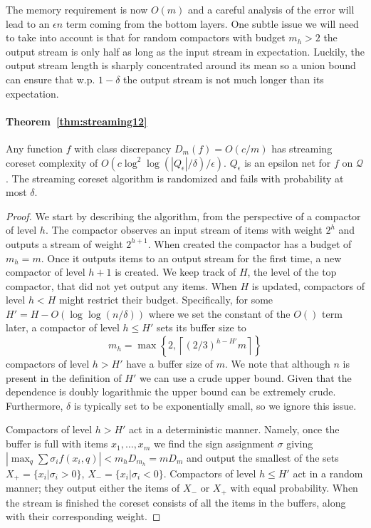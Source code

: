 \documentclass[anon,12pt]{colt2019} %
\newcommand{\eps}{\epsilon}
\newcommand{\F}{\mathcal{F}}
\newcommand{\Q}{\mathcal{Q}}
\newcommand{\ceil}[1]{\left \lceil #1 \right \rceil}
\begin{document}
{The memory requirement is now $O(m)$ and a careful analysis of the error will lead to an $\eps n$ term coming from the bottom layers. One subtle issue we will need to take into account is that for random compactors with budget $m_h>2$ the output stream is only half as long as the input stream in expectation. Luckily, the output stream length is sharply concentrated around its mean so a union bound can ensure that w.p. $1-\delta$ the output stream is not much longer than its expectation.



\paragraph{Theorem~\ref{thm:streaming12}} 
Any function $f$ with class discrepancy $D_m(f) = O(c/m)$ has streaming coreset complexity of $O\left(c\log^2\log(|Q_\eps|/\delta)/\eps\right)$.
$Q_\eps$ is an epsilon net for $f$ on $\Q$. 
The streaming coreset algorithm is randomized and fails with probability at most $\delta$.
\begin{proof}
We start by describing the algorithm, from the perspective of a compactor of level $h$. The compactor observes an input stream of items with weight $2^h$ and outputs a stream of weight $2^{h+1}$. When created the compactor has a budget of $m_h=m$. Once it outputs items to an output stream for the first time, a new compactor of level $h+1$ is created. We keep track of $H$, the level of the top compactor, that did not yet output any items. When $H$ is updated, compactors of level $h<H$ might restrict their budget. Specifically, for some $H'=H-O(\log\log(n/\delta))$ where we set the constant of the $O()$ term later, a compactor of level $h \leq H'$ sets its buffer size to
$$ m_h = \max\left\{2, \ceil{(2/3)^{h-H'}m} \right\} $$
compactors of level $h >H'$ have a buffer size of $m$. We note that although $n$ is present in the definition of $H'$ we can use a crude upper bound. Given that the dependence is doubly logarithmic the upper bound can be extremely crude. Furthermore, $\delta$ is typically set to be exponentially small, so we ignore this issue.

Compactors of level $h >H'$ act in a deterministic manner. Namely, once the buffer is full with items $x_1,\ldots,x_m$ we find the sign assignment $\sigma$ giving $\left|\max_q \sum \sigma_i f(x_i, q)\right| < m_hD_{m_h}=mD_m$ and output the smallest of the sets $X_+=\{x_i | \sigma_i > 0 \}$, $X_- = \{x_i | \sigma_i < 0 \}$. Compactors of level $h \leq H'$ act in a random manner; they output either the items of $X_-$ or $X_+$ with equal probability. When the stream is finished the coreset consists of all the items in the buffers, along with their corresponding weight.


\end{proof}}
\end{document}
